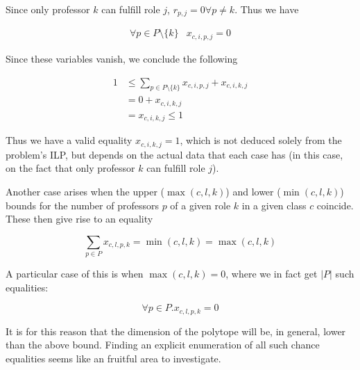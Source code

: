 Since only professor $k$ can fulfill role $j$, $r_{p, j} = 0 \forall p \ne k$. Thus we have

\begin{align*}
\forall p \in P \setminus \{k\} & x_{c, i, p, j} = 0
\end{align*}

Since these variables vanish, we conclude the following

\begin{align*}
1 &\le \sum_{p \in P \setminus \{k\}} x_{c, i, p, j} + x_{c, i, k, j}\\
  &= 0 + x_{c, i, k, j}\\
  &= x_{c, i, k, j} \le 1
\end{align*}

Thus we have a valid equality $x_{c, i, k, j} = 1$, which is not deduced solely from the problem's ILP, but depends on the actual data that each case has (in this case, on the fact that only professor $k$ can fulfill role $j$).

Another case arises when the upper ($\max(c, l, k)$) and lower ($\min(c, l, k)$) bounds for the number of professors $p$ of a given role $k$ in a given class $c$ coincide. These then give rise to an equality

$$
\sum_{p \in P} x_{c, l, p, k} = \min(c, l, k) = \max(c, l, k)
$$

A particular case of this is when $\max(c, l, k) = 0$, where we in fact get $|P|$ such equalities:

$$
\forall p \in P. x_{c, l, p, k} = 0
$$

It is for this reason that the dimension of the polytope will be, in general, lower than the above bound. Finding an explicit enumeration of all such chance equalities seems like an fruitful area to investigate.
